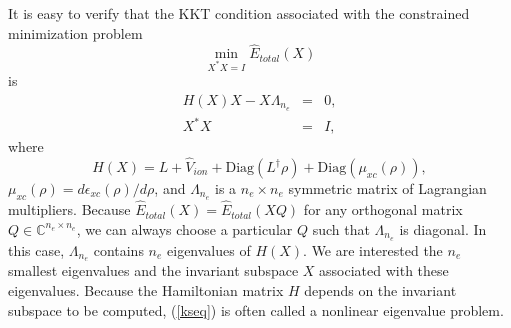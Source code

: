 \documentclass[11pt]{book}
\newcommand{\hEtot}{\hat{E}_{total}}
\begin{document}
It is easy to verify that the KKT condition associated with the 
constrained minimization problem
\begin{equation}
\min_{X^{\ast}X=I} \hEtot (X)
\label{minetot}
\end{equation}
is
\begin{eqnarray}
H(X) X - X \Lambda_{n_e} &=& 0, \label{kseq} \\
X^{\ast} X &=& I, \nonumber
\end{eqnarray}
where 
\begin{equation}
H(X) = L + \hat{V}_{ion} + \mbox{Diag}(L^{\dagger}\rho) + 
\mbox{Diag}(\mu_{xc}(\rho)),
\label{kshamat}
\end{equation}
$\mu_{xc}(\rho) = d \epsilon_{xc}(\rho) / d \rho$,
and $\Lambda_{n_e}$ is a $n_e \times n_e$ symmetric matrix of 
Lagrangian multipliers.  Because $\hEtot(X) = \hEtot(XQ)$
for any orthogonal matrix $Q \in \mathbb{C}^{n_e \times n_e}$, we
can always choose a particular $Q$ such that $\Lambda_{n_e}$ is
diagonal.  In this case, $\Lambda_{n_e}$ contains $n_e$ eigenvalues
of $H(X)$.  We are interested the $n_e$ smallest eigenvalues and 
the invariant subspace $X$ associated with these eigenvalues.
Because the Hamiltonian matrix $H$ depends on the invariant subspace
to be computed, (\ref{kseq}) is often called a nonlinear 
eigenvalue problem.
\end{document}
